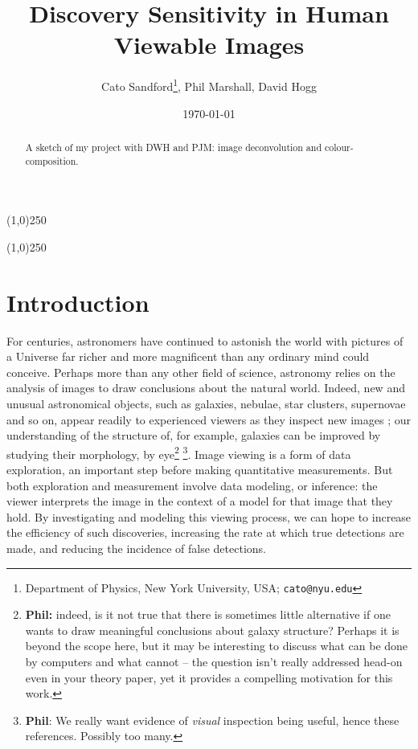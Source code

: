 \documentclass[letterpaper, 11pt]{article}
\title{Discovery Sensitivity in Human Viewable Images}
\author{Cato Sandford\thanks{Department of Physics, New York University, USA; \texttt{cato@nyu.edu}}, Phil Marshall, David Hogg}
\date{\today}
\begin{document}
\maketitle
\vspace{1cm}


\begin{abstract}
A sketch of my project with DWH and PJM: image deconvolution and colour-composition.
\end{abstract}


\begin{center}
\line(1,0){250}
\end{center}
\vspace{-0.5cm}
\tableofcontents
\vspace{-0.1cm}
\begin{center}
\line(1,0){250}
\end{center}
\newpage



\section{Introduction}
\label{sec:intro}

For centuries, astronomers have continued to astonish the world with pictures of a Universe far richer and more magnificent than any ordinary mind could conceive. Perhaps more than any other field of science, astronomy relies on the analysis of images to draw conclusions about the natural world. Indeed, new and unusual astronomical objects, such as
galaxies, nebulae, star clusters, supernovae and so on, appear readily to
experienced viewers as they inspect new images \citep[a recent example is the amateur discovery of a quadruple star system, reported in][]{PH12}; our understanding of  the structure of, for example, galaxies can
be improved by studying their morphology, by eye\footnote{{\bf Phil:} indeed, is it not true that there is sometimes little alternative if one wants to draw meaningful conclusions about galaxy structure? Perhaps it is beyond the scope here, but it may be interesting to discuss what can be done by computers and what cannot -- the question isn't really addressed head-on even in your theory paper, yet it provides a compelling motivation for this work.} \citep[e.g.][]{Lah95, Lah++95, For++11, But11}\footnote{{\bf Phil}: We really want evidence of \emph{visual} inspection being useful, hence these references. Possibly too many.}.
Image viewing is a form of data exploration, an important step before making
quantitative measurements. But both exploration and measurement involve data
modeling, or inference: the viewer interprets the image in the context of a
model for that image that they hold.  By investigating and modeling this
viewing process, we can hope to increase the efficiency of such discoveries,
increasing the rate at which true detections are made, and reducing the
incidence of false detections. 
\end{document}
